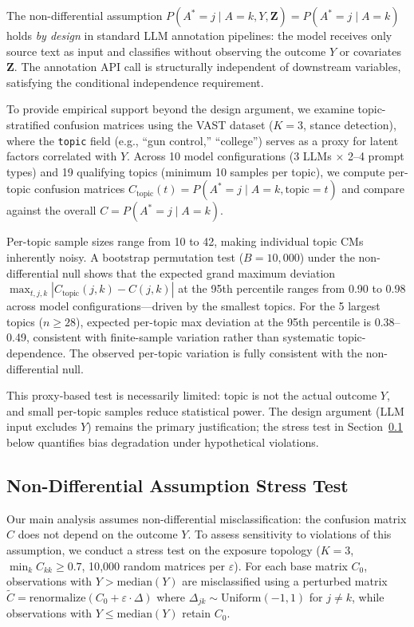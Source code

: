The non-differential assumption $P(A^*{=}j \mid A{=}k, Y, \mathbf{Z}) = P(A^*{=}j \mid A{=}k)$ holds \emph{by design} in standard LLM annotation pipelines: the model receives only source text as input and classifies without observing the outcome $Y$ or covariates $\mathbf{Z}$. The annotation API call is structurally independent of downstream variables, satisfying the conditional independence requirement.

To provide empirical support beyond the design argument, we examine topic-stratified confusion matrices using the VAST dataset ($K{=}3$, stance detection), where the \texttt{topic} field (e.g., ``gun control,'' ``college'') serves as a proxy for latent factors correlated with $Y$. Across 10 model configurations (3 LLMs $\times$ 2--4 prompt types) and 19 qualifying topics (minimum 10 samples per topic), we compute per-topic confusion matrices $C_{\text{topic}}(t) = P(A^*{=}j \mid A{=}k, \text{topic}{=}t)$ and compare against the overall $C = P(A^*{=}j \mid A{=}k)$.

Per-topic sample sizes range from 10 to 42, making individual topic CMs inherently noisy. A bootstrap permutation test ($B{=}10{,}000$) under the non-differential null shows that the expected grand maximum deviation $\max_{t,j,k} |C_{\text{topic}}(j,k) - C(j,k)|$ at the 95th percentile ranges from 0.90 to 0.98 across model configurations---driven by the smallest topics. For the 5 largest topics ($n \geq 28$), expected per-topic max deviation at the 95th percentile is 0.38--0.49, consistent with finite-sample variation rather than systematic topic-dependence. The observed per-topic variation is fully consistent with the non-differential null.

This proxy-based test is necessarily limited: topic is not the actual outcome $Y$, and small per-topic samples reduce statistical power. The design argument (LLM input excludes $Y$) remains the primary justification; the stress test in Section~\ref{sec:nondiff_stress} below quantifies bias degradation under hypothetical violations.

\subsection{Non-Differential Assumption Stress Test}
\label{sec:nondiff_stress}

Our main analysis assumes non-differential misclassification: the confusion matrix $C$ does not depend on the outcome $Y$. To assess sensitivity to violations of this assumption, we conduct a stress test on the exposure topology ($K{=}3$, $\min_k C_{kk} \geq 0.7$, 10{,}000 random matrices per $\varepsilon$). For each base matrix $C_0$, observations with $Y > \text{median}(Y)$ are misclassified using a perturbed matrix $\tilde{C} = \text{renormalize}(C_0 + \varepsilon \cdot \Delta)$ where $\Delta_{jk} \sim \text{Uniform}(-1,1)$ for $j \neq k$, while observations with $Y \leq \text{median}(Y)$ retain $C_0$.

